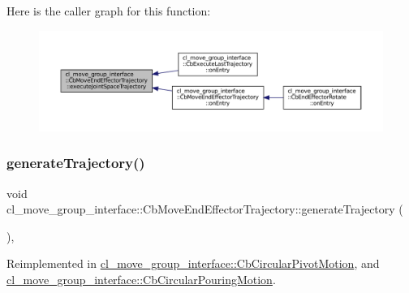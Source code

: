 Here is the caller graph for this function\+:
\nopagebreak
\begin{figure}[H]
\begin{center}
\leavevmode
\includegraphics[width=350pt]{classcl__move__group__interface_1_1CbMoveEndEffectorTrajectory_a3a75fa185c62591e1869427650338a32_icgraph}
\end{center}
\end{figure}
\mbox{\label{classcl__move__group__interface_1_1CbMoveEndEffectorTrajectory_aeae938ab66e18ab7d2fb2427bc83647b}} 
\subsubsection{\texorpdfstring{generate\+Trajectory()}{generateTrajectory()}}
{\footnotesize\ttfamily void cl\+\_\+move\+\_\+group\+\_\+interface\+::\+Cb\+Move\+End\+Effector\+Trajectory\+::generate\+Trajectory (\begin{DoxyParamCaption}{ }\end{DoxyParamCaption})\hspace{0.3cm}{\ttfamily [protected]}, {\ttfamily [virtual]}}



Reimplemented in \hyperlink{classcl__move__group__interface_1_1CbCircularPivotMotion_a8d019ec6b9b26a2af0740b915d441a40}{cl\+\_\+move\+\_\+group\+\_\+interface\+::\+Cb\+Circular\+Pivot\+Motion}, and \hyperlink{classcl__move__group__interface_1_1CbCircularPouringMotion_a9150bb3731082aad3af2d7d6e067a344}{cl\+\_\+move\+\_\+group\+\_\+interface\+::\+Cb\+Circular\+Pouring\+Motion}.



